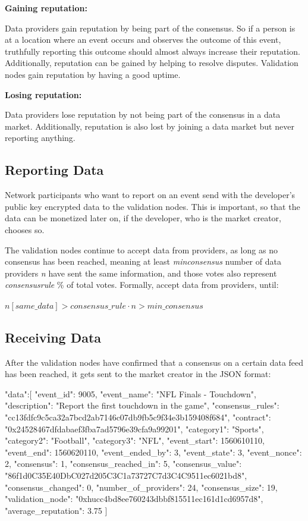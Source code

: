 \textbf{Gaining reputation:}

Data providers gain reputation by being part of the consensus. So if a person is at a location where an event occurs and observes the outcome of this event, truthfully reporting this outcome should almost always increase their reputation. Additionally, reputation can be gained by helping to resolve disputes. Validation nodes gain reputation by having a good uptime\cite{veritywhitepaper}.

\textbf{Losing reputation:}

Data providers lose reputation by not being part of the consensus in a data market. Additionally, reputation is also lost by joining a data market but never reporting anything.

\subsection*{Reporting Data}
Network participants who want to report on an event send with the developer's public key encrypted data to the validation nodes. This is important, so that the data can be monetized later on, if the developer, who is the market creator, chooses so.

The validation nodes continue to accept data from providers, as long as no consensus has been reached, meaning at least \emph{min\textunderscore consensus} number of data providers \emph{n} have sent the same information, and those votes also represent \emph{consensus\textunderscore rule} \% of total votes\cite{veritywhitepaper}. 
Formally, accept data from providers, until:
\\
\\
$n[same\_data] > consensus\_rule \cdot n > min\_consensus$

\subsection*{Receiving Data}
After the validation nodes have confirmed that a consensus on a certain data feed has been reached, it gets sent to the market creator in the JSON format\cite{veritywhitepaper}:

\begin{GenericCode}
{
  "data":[
    {
      "event_id": 9005,
      "event_name": "NFL Finals - Touchdown",
      "description": "Report the first touchdown in the game",
      "consensus_rules": "cc13fdfc9c5ca32a7bcd2ab7146c07db9fb5c9f34e3b159408f684",
      "contract": "0x24528467dfdabaef3fba7ad5796e39cfa9a99201",
      "category1": "Sports",
      "category2": "Football",
      "category3": "NFL",
      "event_start": 1560610110,
      "event_end": 1560620110,
      "event_ended_by": 3,
      "event_state": 3,
      "event_nonce": 2,
      "consensus": 1,
      "consensus_reached_in": 5,
      "consensus_value": "86f1d0C35E40DbC027d205C3C1a73727C7d3C4C9511ec6021bd8",
      "consensus_changed": 0,
      "number_of_providers": 24,
      "consensus_size": 19,
      "validation_node": "0xhucc4bd8ee760243dbbf815511ec161d1cd6957d8",
      "average_reputation": 3.75
    }
  ]
}
\end{GenericCode}

